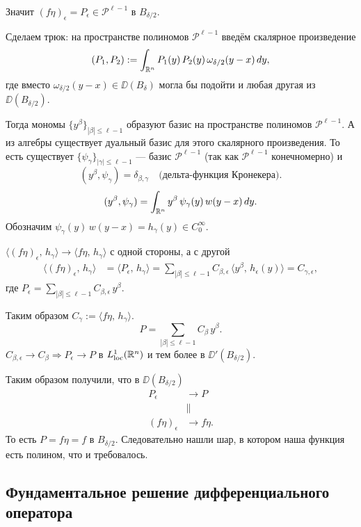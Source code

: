 \documentclass[12pt,a4paper]{article}
\begin{document}
{Значит \((f\eta)_\epsilon=P_\epsilon\in\mathcal{P}^{\ell-1}\)
в \(B_{\delta/2}\).

Сделаем трюк: на пространстве полиномов \(\mathcal{P}^{\ell-1}\)
введём скалярное произведение
\[
(P_1,P_2)
:=
\int_{\mathbb{R}^n}
    P_1(y)\, P_2(y)\, \omega_{\delta/2}(y-x)\, dy,
\]
где вместо \(\omega_{\delta/2}(y-x)\in\DD(B_\delta)\) могла бы подойти
и любая другая из \(\DD(B_{\delta/2})\).

Тогда мономы \(\{y^\beta\}_{|\beta|\le\ell-1}\) образуют базис
на пространстве полиномов \(\mathcal{P}^{\ell-1}\).
А из алгебры существует дуальный базис для этого скалярного произведения.
То есть существует \(\{\psi_\gamma\}_{|\gamma|\le\ell-1}\) --- базис
\(\mathcal{P}^{\ell-1}\)
(так как \(\mathcal{P}^{\ell-1}\) конечномерно) и
\[
(y^\beta,\psi_\gamma)=\delta_{\beta,\gamma}
\quad\text{(дельта-функция Кронекера)}.
\]
\[
(y^\beta,\psi_\gamma)
=
\int_{\mathbb{R}^n} y^\beta\, \psi_\gamma(y)\, w(y-x)\, dy.
\]
Обозначим \(\psi_\gamma(y)\, w(y-x)=h_\gamma(y)\in C_0^\infty\).

\(\langle(f\eta)_\epsilon,\, h_\gamma\rangle
\to
\langle f\eta,\, h_\gamma\rangle\)
с одной стороны, а с другой
\begin{align*}
\langle(f\eta)_\epsilon,\, h_\gamma\rangle
&=
\langle P_\epsilon,\, h_\gamma\rangle
=
\sum_{|\beta|\le\ell-1}
    C_{\beta,\epsilon}\,
    \langle y^\beta,\, h_\epsilon(y) \rangle
=
C_{\gamma,\epsilon},
\end{align*}
где \(P_\epsilon=\sum_{|\beta|\le\ell-1} C_{\beta,\epsilon}\, y^\beta\).

Таким образом \(C_\gamma:=\langle f\eta,\, h_\gamma\rangle\).
\[
P=\sum_{|\beta|\le\ell-1} C_\beta\, y^\beta.
\]
\(C_{\beta,\epsilon}\to C_\beta
\Rightarrow
P_\epsilon\to P\) в \(L^1_{\mathrm{loc}}(\mathbb{R}^n)\)
и тем более в \(\DD'(B_{\delta/2})\).

Таким образом получили, что в \(\DD(B_{\delta/2})\)
\[
\begin{aligned}
P_\epsilon
&\to P \\
&\parallel \\
(f\eta)_\epsilon
&\to f\eta.
\end{aligned}
\]
То есть \(P=f\eta=f\) в \(B_{\delta/2}\).
Следовательно нашли шар, в котором наша функция есть полином,
что и требовалось.
}

\subsection{Фундаментальное решение дифференциального оператора}
\end{document}

